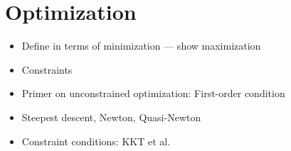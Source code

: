 \documentclass[main.tex]{subfiles}
\begin{document}
\section{Optimization}

\begin{itemize}
\item Define in terms of minimization --- show maximization
\item Constraints
\item Primer on unconstrained optimization: First-order condition
\item Steepest descent, Newton, Quasi-Newton
\item Constraint conditions: KKT et al.
\end{itemize}

\biblio{} %
\end{document}
